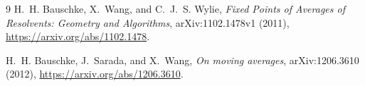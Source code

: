 \documentclass[11pt]{article}
\begin{document}
\begin{thebibliography}{9}
H.~H. Bauschke, X.~Wang, and C.~J.~S. Wylie,
\emph{Fixed Points of Averages of Resolvents: Geometry and Algorithms},
arXiv:1102.1478v1 (2011),
\url{https://arxiv.org/abs/1102.1478}.

H.~H. Bauschke, J.~Sarada, and X.~Wang,
\emph{On moving averages}, arXiv:1206.3610 (2012),
\url{https://arxiv.org/abs/1206.3610}.
\end{thebibliography}
\end{document}
